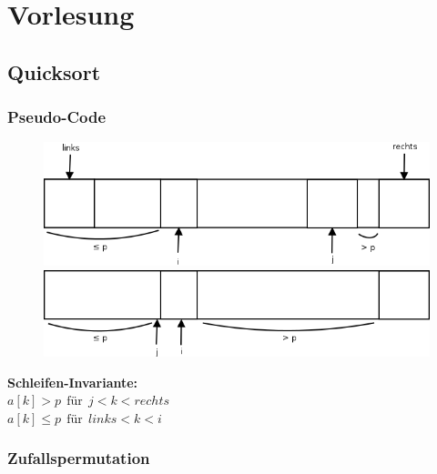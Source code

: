 \chapter{Vorlesung}
\vspace{-30pt}
\section{Quicksort}
\vspace{-20pt}
\subsection{Pseudo-Code}
\vspace{-30pt}

\begin{figure}
\vspace{-70pt}
\includegraphics[width=\linewidth]{6/Grafik/img1.png}
\includegraphics[width=\linewidth]{6/Grafik/img2.png}
\caption{}
\end{figure}

\vspace{0pt}
\textbf{Schleifen-Invariante:}\\
$a[k] > p~~\text{für}~~j <k<rechts$\\
$a[k] \leq p ~~\text{für}~~links<k<i$ 
\vspace{50pt}

\pagebreak 

\subsection{Zufallspermutation}


